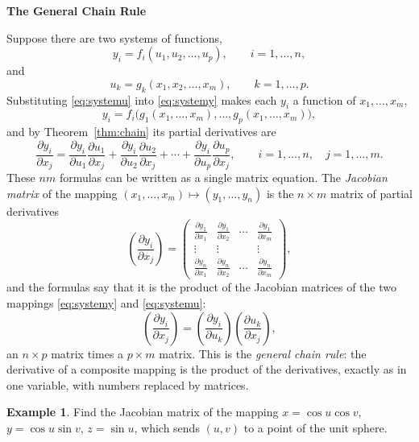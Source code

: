 \documentclass[11pt,a4paper]{article}
\theoremstyle{definition}
\newtheorem{exa}[thm]{Example}
\newcommand{\subhead}[1]{%
  \par\medskip\noindent\textbf{#1}\par\nobreak\smallskip}
\begin{document}
\subhead{The General Chain Rule}

Suppose there are two systems of functions,
\begin{equation}
y_i = f_i(u_1,u_2,\dots, u_p),\qquad i = 1,\dots,n,
\label{eq:systemy}
\end{equation}
and
\begin{equation}
u_k = g_k(x_1,x_2,\dots, x_m),\qquad k = 1,\dots,p .
\label{eq:systemu}
\end{equation}
Substituting \eqref{eq:systemu} into \eqref{eq:systemy} makes each $y_i$ a
function of $x_1,\dots,x_m$,
\[y_i = f_i\big(g_1(x_1,\dots, x_m), \dots, g_p (x_1,\dots, x_m)\big),\]
and by Theorem~\ref{thm:chain} its partial derivatives are
\[\frac{\partial y_i}{\partial x_j} = \frac{\partial y_i}{\partial u_1}
\frac{\partial u_1}{\partial x_j} + \frac{\partial y_i}{\partial
u_2}\frac{\partial u_2}{\partial x_j} + \cdots + \frac{\partial y_i}{\partial
u_p}\frac{\partial u_p}{\partial x_j},\qquad i = 1,\dots, n,\quad j = 1,\dots,
m .\]
These $nm$ formulas can be written as a single matrix equation. The
\emph{Jacobian matrix} of the mapping $(x_1,\dots,x_m)\mapsto(y_1,\dots,y_n)$ is
the $n\times m$ matrix of partial derivatives
\[\left(\frac{\partial y_i}{\partial x_j}\right)=
\begin{pmatrix}
\frac{\partial y_1}{\partial x_1} & \frac{\partial y_1}{\partial x_2} & \cdots &
\frac{\partial y_1}{\partial x_m}\\[1ex]
\vdots & \vdots & & \vdots\\[1ex]
\frac{\partial y_n}{\partial x_1} & \frac{\partial y_n}{\partial x_2} & \cdots &
\frac{\partial y_n}{\partial x_m}
\end{pmatrix},\]
and the formulas say that it is the product of the Jacobian matrices of the two
mappings \eqref{eq:systemy} and \eqref{eq:systemu}:
\[\left(\frac{\partial y_i}{\partial x_j}\right) = \left(\frac{\partial
y_i}{\partial u_k}\right)\left(\frac{\partial u_k}{\partial x_j}\right),\]
an $n\times p$ matrix times a $p\times m$ matrix. This is the \emph{general chain
rule}: the derivative of a composite mapping is the product of the derivatives,
exactly as in one variable, with numbers replaced by matrices.

\begin{exa}
\label{ex:jacmatrix}
Find the Jacobian matrix of the mapping $x = \cos u \cos v$, $y = \cos u \sin
v$, $z = \sin u$, which sends $(u,v)$ to a point of the unit sphere.
\end{exa}
\end{document}

